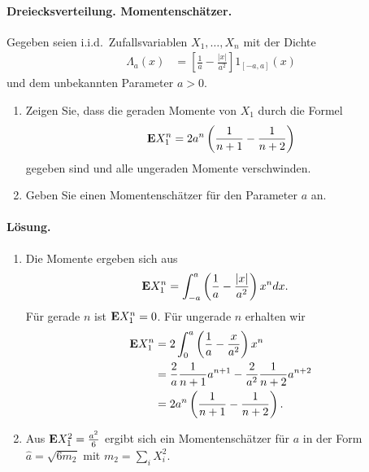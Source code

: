 \paragraph{Dreiecksverteilung. Momentenschätzer.} Gegeben seien
i.i.d.\ Zufallsvariablen $X_1,\ldots, X_n$ mit der Dichte 
\begin{align*}
    \Lambda_a(x) &= \left[ \frac{1}{a} - \frac{|x|}{a^2} \right] 1_{[-a,a]}(x)
\end{align*}
und dem unbekannten Parameter $a>0$. 
\begin{enumerate}
    \item Zeigen Sie, dass die geraden Momente von $X_1$ durch die Formel
        \begin{equation*}
            \mathbf{E} X_1^n = 2 a^n \left( \frac{1}{n+1} - \frac{1}{n+2} \right)
        \end{equation*}
        gegeben sind und alle ungeraden Momente verschwinden. 
    \item Geben Sie einen Momentenschätzer für den Parameter $a$ an.
\end{enumerate}

\paragraph*{Lösung.} 
\begin{enumerate}
    \item Die Momente ergeben sich aus
        \begin{align*}
            \mathbf{E} X_1^n &= \int_{-a}^{a} \left( \frac{1}{a} - \frac{|x|}{a^2} \right) x^n dx.
        \end{align*}
        Für gerade $n$ ist $\mathbf{E} X_1^n=0$. Für ungerade $n$ erhalten wir
        \begin{align*}
            \mathbf{E} X_1^{n} &= 2 \int_{0}^{a} \left( \frac{1}{a} - \frac{x}{a^2} \right) x^{n} \\
            &= \frac{2}{a} \frac{1}{n+1} a^{n+1} - \frac{2}{a^2} \frac{1}{n+2}a^{n+2} \\
            &= 2 a^{n} \left( \frac{1}{n+1}- \frac{1}{n+2} \right).
        \end{align*}
    \item Aus $\mathbf{E} X_1^2 = \frac{a^2}{6}$ ergibt sich ein Momentenschätzer für
        $a$ in der Form $\hat a = \sqrt{6 m_2}$ mit $m_2 = \sum_{i}^{} X_i^2$. 
\end{enumerate}





